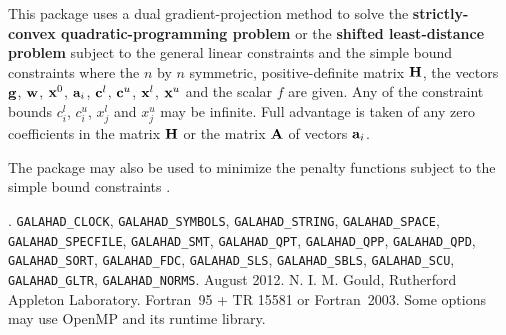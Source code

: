 \documentclass{galahad}
\newcommand{\packagename}{DQP}
\newcommand{\fullpackagename}{\libraryname\_\packagename}
\begin{document}
\galheader


\galsummary
This package uses a dual gradient-projection method
to solve the {\bf strictly-convex quadratic-programming problem}
or the {\bf shifted least-distance problem}
subject to the general linear constraints
and the simple bound constraints
where the $n$ by $n$ symmetric, positive-definite matrix ${\mathbf{H}}$, the
vectors ${\mathbf{g}}$, ${\mathbf{w}}$, ${\mathbf{x}}^{0}$,
${\mathbf{a}}_{i}$, ${\mathbf{c}}^{l}$, ${\mathbf{c}}^{u}$, ${\mathbf{x}}^{l}$,
${\mathbf{x}}^{u}$ and the scalar $f$ are given.
Any of the constraint bounds $c_{i}^{l}$, $c_{i}^{u}$,
$x_{j}^{l}$ and $x_{j}^{u}$ may be infinite.
Full advantage is taken of any zero coefficients in the matrix ${\mathbf{H}}$
or the matrix ${\mathbf{A}}$ of vectors ${\mathbf{a}}_{i}$.

The package may also be used to minimize the penalty functions
subject to the simple bound constraints .



\galattributes
\galversions{\tt  \fullpackagename\_single, \fullpackagename\_double}.
\galuses
{\tt GALAHAD\_CLOCK},
{\tt GALAHAD\_SY\-M\-BOLS},
{\tt GALAHAD\-\_STRING},
{\tt GALAHAD\-\_SPACE},
{\tt GALAHAD\_SPECFILE},
{\tt GALAHAD\_SMT},
{\tt GALAHAD\_QPT},
{\tt GALAHAD\_QPP},
{\tt GALAHAD\_\-QPD},
{\tt GALAHAD\_\-SORT},
{\tt GALAHAD\_\-FDC},
{\tt GALAHAD\_\-SLS},
{\tt GALAHAD\_\-SBLS},
{\tt GALAHAD\_\-SCU},
{\tt GALAHAD\_\-GLTR},
{\tt GALAHAD\_NORMS}.
\galdate August 2012.
\galorigin N. I. M. Gould, Rutherford Appleton Laboratory.
\gallanguage Fortran~95 + TR 15581 or Fortran~2003.
\galparallelism Some options may use OpenMP and its runtime library.

\end{document}
